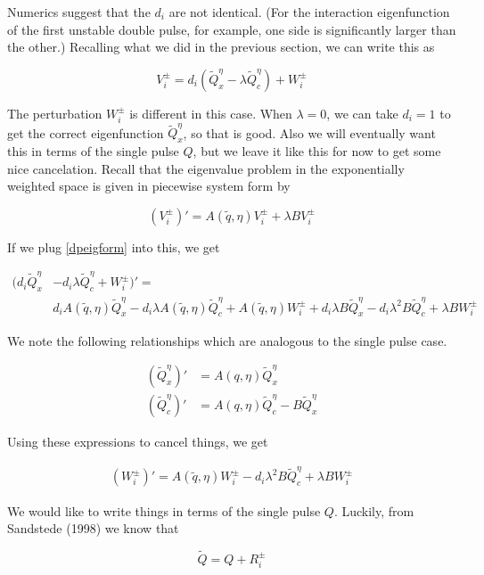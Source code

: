 \documentclass[12pt]{article}
\begin{document}
Numerics suggest that the $d_i$ are not identical. (For the interaction eigenfunction of the first unstable double pulse, for example, one side is significantly larger than the other.) Recalling what we did in the previous section, we can write this as

\begin{equation}\label{dpeigform}
V_i^\pm = d_i( \tilde{Q}^\eta_x - \lambda \tilde{Q}^\eta_c ) + W_i^\pm
\end{equation}

The perturbation $W_i^\pm$ is different in this case. When $\lambda = 0$, we can take $d_i = 1$ to get the correct eigenfunction $\tilde{Q}^\eta_x$, so that is good. Also we will eventually want this in terms of the single pulse $Q$, but we leave it like this for now to get some nice cancelation. Recall that the eigenvalue problem in the exponentially weighted space is given in piecewise system form by

\[
(V_i^\pm)' = A(\tilde{q}, \eta)V_i^\pm + \lambda B V_i^\pm
\]

If we plug \eqref{dpeigform} into this, we get 

\begin{align*}
(d_i \tilde{Q}^\eta_x &- d_i \lambda \tilde{Q}^\eta_c  + W_i^\pm)' = \\
& d_i A(\tilde{q}, \eta) \tilde{Q}^\eta_x - d_i \lambda A(\tilde{q}, \eta)\tilde{Q}^\eta_c
+ A(\tilde{q}, \eta) W_i^\pm + d_i \lambda B \tilde{Q}^\eta_x - d_i \lambda^2 B \tilde{Q}^\eta_c 
+ \lambda B W_i^\pm 
\end{align*}

We note the following relationships which are analogous to the single pulse case.

\begin{align*}
(\tilde{Q}^\eta_x)' &= A(q,\eta)\tilde{Q}^\eta_x \\
(\tilde{Q}^\eta_c)' &= A(q, \eta)\tilde{Q}^\eta_c - B \tilde{Q}^\eta_x  
\end{align*} 


Using these expressions to cancel things, we get

\begin{align*}
(W_i^\pm)' = A(\tilde{q}, \eta) W_i^\pm - d_i \lambda^2 B \tilde{Q}^\eta_c 
+ \lambda B W_i^\pm 
\end{align*}

We would like to write things in terms of the single pulse $Q$. Luckily, from Sandstede (1998) we know that

\[
\tilde{Q} = Q + R_i^\pm
\]
\end{document}
